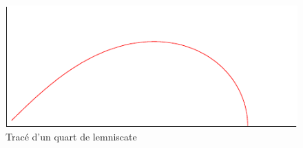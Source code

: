 \begin{enumerate}
\begin{enumerate}
\end{enumerate}
\begin{figure}
 \centering
 \includegraphics{Clemn_2.pdf}
 \caption{Tracé d'un quart de lemniscate}
 \label{fig:Clemn_2}
\end{figure}

\end{enumerate}
